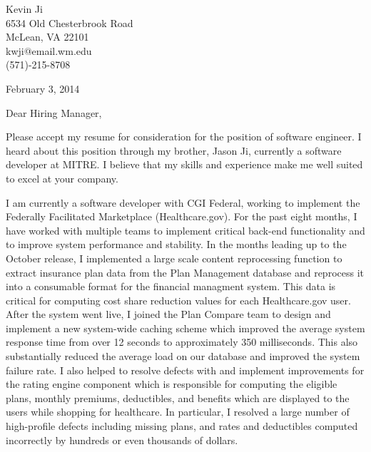 \documentclass[10pt, letterpaper]{letter}
\begin{document}
 

\begin{flushright} 
Kevin Ji \\
6534 Old Chesterbrook Road \\
McLean, VA 22101 \\
kwji@email.wm.edu \\
(571)-215-8708

February 3, 2014
\end{flushright}

Dear Hiring Manager,

Please accept my resume for consideration for the position of software engineer. I heard about this position through my brother, Jason Ji, currently a software developer at MITRE. I believe that my skills and experience make me well suited to excel at your company.

I am currently a software developer with CGI Federal, working to implement the Federally Facilitated Marketplace (Healthcare.gov). For the past eight months, I have worked with multiple teams to implement critical back-end functionality and to improve system performance and stability. In the months leading up to the October release, I implemented a large scale content reprocessing function to extract insurance plan data from the Plan Management database and reprocess it into a consumable format for the financial managment system. This data is critical for computing cost share reduction values for each Healthcare.gov user. After the system went live, I joined the Plan Compare team to design and implement a new system-wide caching scheme which improved the average system response time from over 12 seconds to approximately 350 milliseconds. This also substantially reduced the average load on our database and improved the system failure rate. I also helped to resolve defects with and implement improvements for the rating engine component which is responsible for computing the eligible plans, monthly premiums, deductibles, and benefits which are displayed to the users while shopping for healthcare. In particular, I resolved a large number of high-profile defects including missing plans, and rates and deductibles computed incorrectly by hundreds or even thousands of dollars. 

\end{document}
